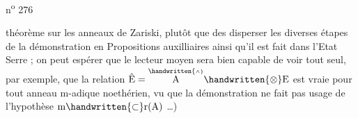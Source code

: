 
n\textsuperscript{o} 276

théorème sur les anneaux de Zariski, plutôt que des disperser les diverses étapes de la démonstration en Propositions auxilliaires ainsi qu'il est fait dans l'Etat Serre ; on peut espérer que le lecteur moyen sera bien capable de voir tout seul, par exemple, que la relation $\hat{\mathrm E}=\overset{\handwritten{\scriptscriptstyle\wedge}}{\mathrm A}\handwritten{\otimes}\mathrm E$ est vraie pour tout anneau $\mathrm m$-adique noethérien, vu que la démonstration ne fait pas usage de l'hypothèse $\mathrm m\handwritten{\subset}\mathrm r(\mathrm A)$ \ldots)

